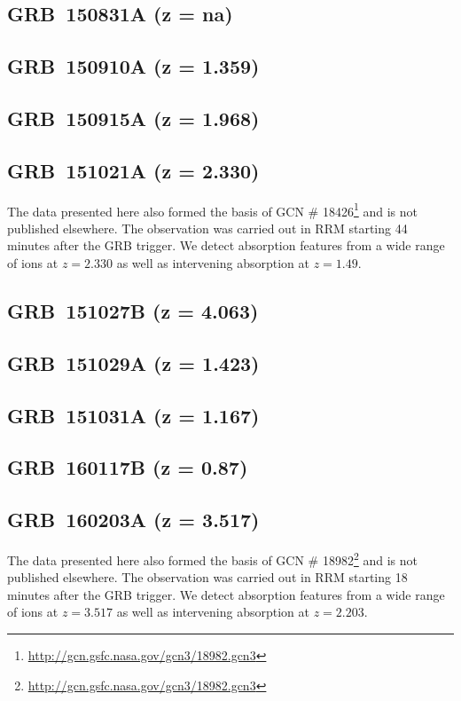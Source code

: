 \documentclass{aa}    %
\begin{document}
\subsection{GRB~150831A (z = na)}	



\subsection{GRB~150910A (z = 1.359)}	



\subsection{GRB~150915A (z = 1.968)}	



\subsection{GRB~151021A (z = 2.330)}
The data presented here also formed the basis of GCN \#
18426\footnote{\url{http://gcn.gsfc.nasa.gov/gcn3/18982.gcn3}} and is not
published elsewhere. The observation was carried out in RRM starting 44 minutes
after the GRB trigger. We detect absorption features from a wide range of ions
at $z=2.330$ as well as intervening absorption at $z=1.49$.



\subsection{GRB~151027B (z = 4.063)}	



\subsection{GRB~151029A (z = 1.423)}	



\subsection{GRB~151031A (z = 1.167)}	



\subsection{GRB~160117B (z = 0.87)}	



\subsection{GRB~160203A (z = 3.517)}
The data presented here also formed the basis of GCN \#
18982\footnote{\url{http://gcn.gsfc.nasa.gov/gcn3/18982.gcn3}} and is not
published elsewhere. The observation was carried out in RRM starting 18 minutes
after the GRB trigger. We detect absorption features from a wide range of ions
at $z=3.517$ as well as intervening absorption at $z=2.203$.
\end{document}
